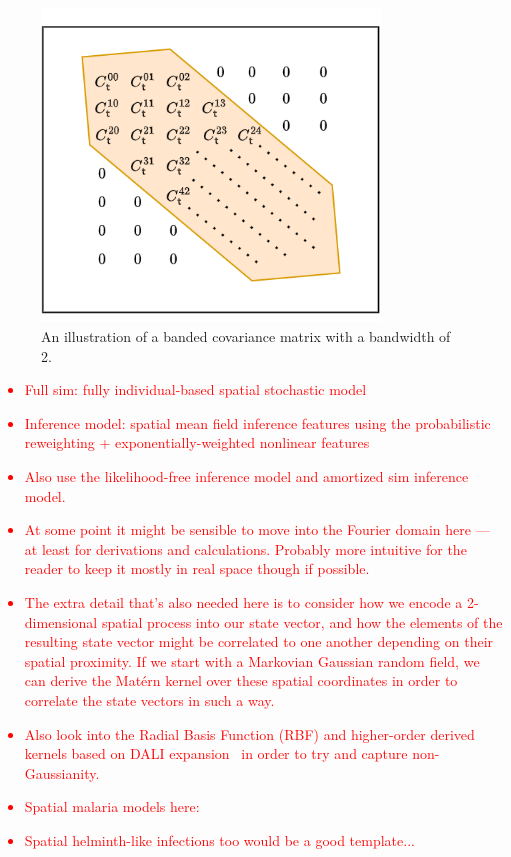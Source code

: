 \begin{figure}[h]
\centering
\includegraphics[width=9cm]{images/chapter-7-banded-matrix.drawio.png}
\caption{An illustration of a banded covariance matrix with a bandwidth of 2.}
\label{fig:banded-matrix}
\end{figure}

\textcolor{red}{
\begin{itemize}
\item{Full sim: fully individual-based spatial stochastic model}
\item{Inference model: spatial mean field inference features using the probabilistic reweighting + exponentially-weighted nonlinear features}
\item{Also use the likelihood-free inference model and amortized sim inference model.}
\end{itemize}
}

\textcolor{red}{
\begin{itemize}
\item{At some point it might be sensible to move into the Fourier domain here --- at least for derivations and calculations. Probably more intuitive for the reader to keep it mostly in real space though if possible.} 
\item{The extra detail that's also needed here is to consider how we encode a 2-dimensional spatial process into our state vector, and how the elements of the resulting state vector might be correlated to one another depending on their spatial proximity. If we start with a Markovian Gaussian random field, we can derive the Mat\'{e}rn kernel over these spatial coordinates in order to correlate the state vectors in such a way.} 
\item{Also look into the Radial Basis Function (RBF) and higher-order derived kernels based on DALI expansion~\cite{sellentin2014breaking} in order to try and capture non-Gaussianity.}
\item{Spatial malaria models here:~\cite{smith2008towards,djordjevic2022stochastic}}
\item{Spatial helminth-like infections too would be a good template...}
\end{itemize}
}
